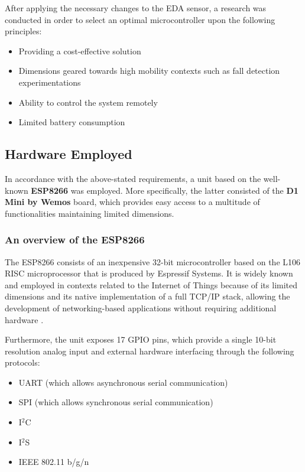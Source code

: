 After applying the necessary changes to the EDA sensor, a research was conducted in order to select an optimal microcontroller upon the following principles: 

\begin{itemize}
    \item Providing a cost-effective solution
    \item Dimensions geared towards high mobility contexts such as fall detection experimentations
    \item Ability to control the system remotely
    \item Limited battery consumption
\end{itemize}

\subsection{Hardware Employed}\label{sec:hardware-employed}

In accordance with the above-stated requirements, a unit based on the well-known \textbf{ESP8266} was employed. More specifically, the latter consisted of the \textbf{D1 Mini by Wemos} board, which provides easy access to a multitude of functionalities maintaining limited dimensions.

\subsubsection{An overview of the ESP8266}\label{sec:esp8266}

The ESP8266 consists of an inexpensive 32-bit microcontroller based on the L106 RISC microprocessor that is produced by Espressif Systems. It is widely known and employed in contexts related to the Internet of Things because of its limited dimensions and its native implementation of a full TCP/IP stack, allowing the development of networking-based applications without requiring additional hardware \cite{esp8266}.

Furthermore, the unit exposes 17 GPIO pins, which provide a single 10-bit resolution analog input and external hardware interfacing through the following protocols:

\begin{itemize}
    \item UART (which allows asynchronous serial communication)
    \item SPI (which allows synchronous serial communication)
    \item I$^2$C %
    \item I$^2$S %
    \item IEEE 802.11 b/g/n
\end{itemize}

